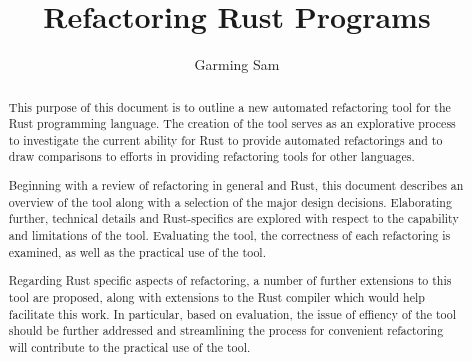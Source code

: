 \documentclass[11pt
              , a4paper
              , twoside
              , openright
              ]{report}
\title{Refactoring Rust Programs}
\author{Garming Sam}
\date{}
\begin{document}
\frontmatter



\begin{abstract}

This purpose of this document is to outline a new automated refactoring tool for the Rust programming language. The creation of the tool serves as an explorative process to investigate the current ability for Rust to provide automated refactorings and to draw comparisons to  efforts in providing refactoring tools for other languages. 

Beginning with a review of refactoring in general and Rust, this document describes an overview of the tool along with a selection of the major design decisions. Elaborating further, technical details and Rust-specifics are explored with respect to the capability and limitations of the tool. Evaluating the tool, the correctness of each refactoring is examined, as well as the practical use of the tool.

Regarding Rust specific aspects of refactoring, a number of further extensions to this tool are proposed, along with extensions to the Rust compiler which would help facilitate this work. In particular, based on evaluation, the issue of effiency of the tool should be further addressed and streamlining the process for convenient refactoring will contribute to the practical use of the tool.



\end{abstract}
\end{document}

